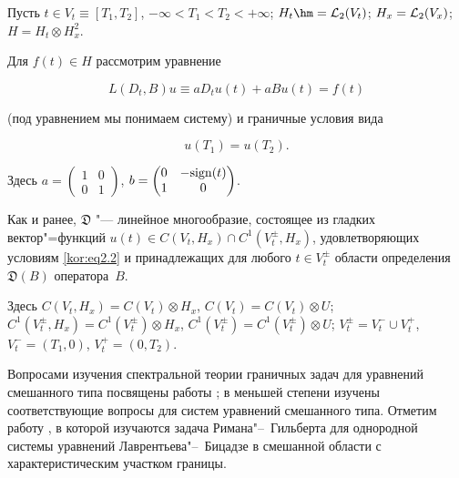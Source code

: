 \smallskip




Пусть $t\in V_t\equiv[T_1,T_2]$, $-\infty<T_1<T_2<+\infty$; $H_t \hm={\cal L}_2(V_t)$; $H_x={\cal L}_2(V_x)$; $H=H_t\otimes H_x^2$. 



Для $f(t)\in H$ рассмотрим уравнение

\begin{equation}

\label{kor:eq2.1}

L(D_t,B)u\equiv aD_tu(t)+aBu(t)=f(t)

\end{equation}

(под уравнением мы понимаем систему) и граничные условия вида

\begin{equation}

\label{kor:eq2.2} 

u(T_1)=u(T_2).

\end{equation}

Здесь $a=\begin{pmatrix}1 & 0\\0 & 1\end{pmatrix}$, $b=\begin{pmatrix}0 & -{\rm sign}(t)\\1 & 0\end{pmatrix}$.



Как и ранее, $\mathfrak{D}$ "--- линейное многообразие, состоящее из гладких вектор"=функций $u(t)\in C(V_t,H_x)\cap C^1(V_t^{\pm},H_x)$, удовлетворяющих условиям \eqref{kor:eq2.2} и принадлежащих для любого $t\in V_t^{\pm}$ области определения $\mathfrak{D}(B)$ оператора~$B$. 

Здесь $C(V_t,H_x)=C(V_t)\otimes H_x$, $C(V_t)=C(V_t)\otimes U$; ${C^1(V_t^{\pm},H_x)=C^1(V_t^{\pm})\otimes H_x}$, ${C^1(V_t^\pm)=C^1(V_t^\pm)\otimes U}$; $V_t^\pm=V_t^-\cup V_t^+$, $V_t^-=(T_1,0)$, $V_t^+=(0,T_2)$.



Вопросами изучения спектральной теории граничных задач для уравнений смешанного типа посвящены работы \cite{kor:bib4, kor:bib8, kor:bib12}; в меньшей степени изучены соответствующие вопросы для систем уравнений смешанного типа. Отметим работу \cite{kor:bib14}, в которой изучаются задача Римана"--~Гильберта для однородной системы уравнений Лаврентьева"--~Бицадзе в смешанной области с характеристическим участком границы.





